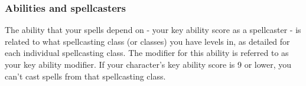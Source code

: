 \subsubsection{Abilities and spellcasters}
The ability that your spells depend on - your key ability score as a spellcaster - is related to what spellcasting class (or classes) you have levels in, as detailed for each individual spellcasting class.
The modifier for this ability is referred to as your key ability modifier. 
If your character's key ability score is 9 or lower, you can't cast spells from that spellcasting class.

